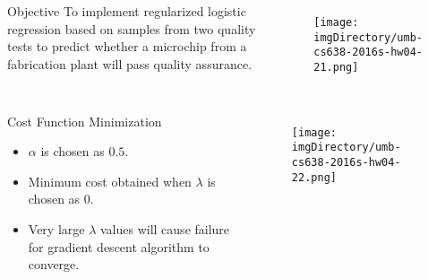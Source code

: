 \documentclass[aspectratio=169]{beamer}
\begin{document}
\begin{slide}

	\begin{columns}

	\begin{block}{Objective}
	To implement regularized logistic regression based on samples from two quality tests to predict whether a microchip from a fabrication plant will pass quality assurance.
	\end{block}

	\begin{figure}
	\texttt{[image: \\imgDirectory/umb-cs638-2016s-hw04-21.png]}
	\end{figure}

	\end{columns}

\end{slide}

\begin{slide}

	\begin{columns}

	\column{0.4\textwidth}
	\begin{block}{Cost Function Minimization}
	\begin{itemize}
	\item $\alpha$ is chosen as $0.5$.
	\item Minimum cost obtained when $\lambda$ is chosen as $0$.
	\item Very large $\lambda$ values will cause failure for gradient descent algorithm to converge.
	\end{itemize}
	\end{block}

	\column{0.6\textwidth}
	\begin{figure}
	\texttt{[image: \\imgDirectory/umb-cs638-2016s-hw04-22.png]}
	\end{figure}

	\end{columns}

\end{slide}
\end{document}
